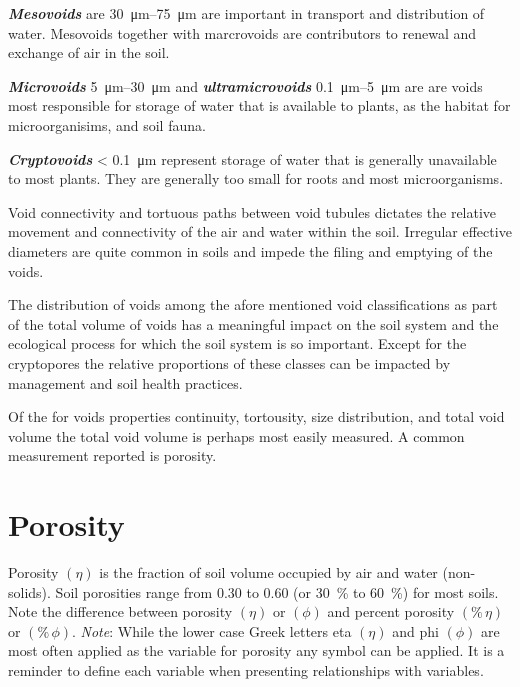 \documentclass{article}
\begin{document}
\textbf{\textit{Mesovoids}} are \qtyrange{30}{75}{\micro\metre} are important in transport and distribution of water. Mesovoids together with marcrovoids are contributors to renewal and exchange of air in the soil.  

\textbf{\textit{Microvoids}} \qtyrange{5}{30}{\micro\metre} and \textbf{\textit{ultramicrovoids}} \qtyrange{0.1}{5}{\micro\metre} are are voids most responsible for storage of water that is available to plants, as the habitat for microorganisims, and soil fauna.  

\textbf{\textit{Cryptovoids}} \textless{} \qty{0.1}{\micro\metre} represent storage of water that is generally unavailable to most plants. They are generally too small for roots and most microorganisms.  

Void connectivity and tortuous paths between void tubules dictates the relative movement and connectivity of the air and water within the soil. Irregular effective diameters are quite common in soils and impede the filing and emptying of the voids.  

The distribution of voids among the afore mentioned void classifications as part of the total volume of voids has a meaningful impact on the soil system and the ecological process for which the soil system is so important. Except for the cryptopores the relative proportions of these classes can be impacted by management and soil health practices.  

Of the for voids properties continuity, tortousity, size distribution, and total void volume the total void volume is perhaps most easily measured. A common measurement reported is porosity.  

\section{Porosity}
\label{porosity}

Porosity $\left(\eta\right)$ is the fraction of soil volume occupied by air and water (non-solids). Soil porosities range from 0.30 to 0.60 (or \qty{30}{\percent} to \qty{60}{\percent}) for most soils. Note the difference between porosity $\left(\eta\right)$ or $\left(\phi\right)$ and percent porosity $\left(\%\,\eta\right)$ or $\left(\%\,\phi\right)$. \textit{Note}: While the lower case Greek letters eta $\left(\eta\right)$ and phi $\left(\phi\right)$ are most often applied as the variable for porosity any symbol can be applied. It is a reminder to define each variable when presenting relationships with variables. 
\end{document}
